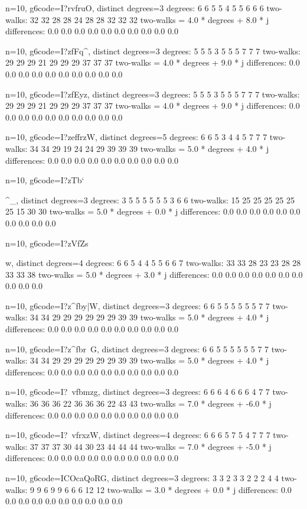 {{{{{{{{{{{{{{{{{{n=10, g6code=I?rvfru}O, distinct degrees=3
degrees: 6 6 5 5 4 5 5 6 6 6 
two-walks: 32 32 28 28 24 28 28 32 32 32 
two-walks = 4.0 * degrees + 8.0 * j
differences: 0.0 0.0 0.0 0.0 0.0 0.0 0.0 0.0 0.0 0.0 

n=10, g6code=I?zfFq^\w, distinct degrees=3
degrees: 5 5 5 3 5 5 5 7 7 7 
two-walks: 29 29 29 21 29 29 29 37 37 37 
two-walks = 4.0 * degrees + 9.0 * j
differences: 0.0 0.0 0.0 0.0 0.0 0.0 0.0 0.0 0.0 0.0 

n=10, g6code=I?zfEyz\w, distinct degrees=3
degrees: 5 5 5 3 5 5 5 7 7 7 
two-walks: 29 29 29 21 29 29 29 37 37 37 
two-walks = 4.0 * degrees + 9.0 * j
differences: 0.0 0.0 0.0 0.0 0.0 0.0 0.0 0.0 0.0 0.0 

n=10, g6code=I?zeffrzW, distinct degrees=5
degrees: 6 6 5 3 4 4 5 7 7 7 
two-walks: 34 34 29 19 24 24 29 39 39 39 
two-walks = 5.0 * degrees + 4.0 * j
differences: 0.0 0.0 0.0 0.0 0.0 0.0 0.0 0.0 0.0 0.0 

n=10, g6code=I?zTb`}^_, distinct degrees=3
degrees: 3 5 5 5 5 5 5 3 6 6 
two-walks: 15 25 25 25 25 25 25 15 30 30 
two-walks = 5.0 * degrees + 0.0 * j
differences: 0.0 0.0 0.0 0.0 0.0 0.0 0.0 0.0 0.0 0.0 

n=10, g6code=I?zVfZs{w, distinct degrees=4
degrees: 6 6 5 4 4 5 5 6 6 7 
two-walks: 33 33 28 23 23 28 28 33 33 38 
two-walks = 5.0 * degrees + 3.0 * j
differences: 0.0 0.0 0.0 0.0 0.0 0.0 0.0 0.0 0.0 0.0 

n=10, g6code=I?z^fby|W, distinct degrees=3
degrees: 6 6 5 5 5 5 5 5 7 7 
two-walks: 34 34 29 29 29 29 29 29 39 39 
two-walks = 5.0 * degrees + 4.0 * j
differences: 0.0 0.0 0.0 0.0 0.0 0.0 0.0 0.0 0.0 0.0 

n=10, g6code=I?z^fbr~G, distinct degrees=3
degrees: 6 6 5 5 5 5 5 5 7 7 
two-walks: 34 34 29 29 29 29 29 29 39 39 
two-walks = 5.0 * degrees + 4.0 * j
differences: 0.0 0.0 0.0 0.0 0.0 0.0 0.0 0.0 0.0 0.0 

n=10, g6code=I?~vfbmzg, distinct degrees=3
degrees: 6 6 6 4 6 6 6 4 7 7 
two-walks: 36 36 36 22 36 36 36 22 43 43 
two-walks = 7.0 * degrees + -6.0 * j
differences: 0.0 0.0 0.0 0.0 0.0 0.0 0.0 0.0 0.0 0.0 

n=10, g6code=I?~vfrxzW, distinct degrees=4
degrees: 6 6 6 5 7 5 4 7 7 7 
two-walks: 37 37 37 30 44 30 23 44 44 44 
two-walks = 7.0 * degrees + -5.0 * j
differences: 0.0 0.0 0.0 0.0 0.0 0.0 0.0 0.0 0.0 0.0 

n=10, g6code=ICOcaQoRG, distinct degrees=3
degrees: 3 3 2 3 3 2 2 2 4 4 
two-walks: 9 9 6 9 9 6 6 6 12 12 
two-walks = 3.0 * degrees + 0.0 * j
differences: 0.0 0.0 0.0 0.0 0.0 0.0 0.0 0.0 0.0 0.0 

}}}}}}}}}}}}}}}}}
